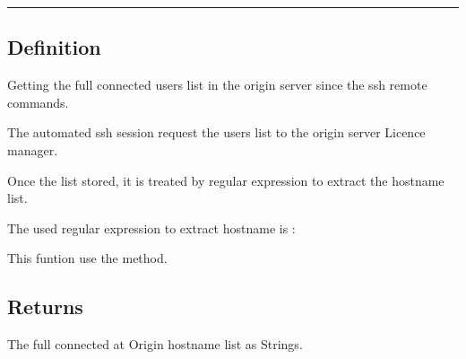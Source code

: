 \documentclass[letterpaper,10pt,english]{sphinxmanual}
\begin{document}
\bigskip\hrule\bigskip



\subsection{Definition}
\label{\detokenize{OA/Get_Connected:definition}}
\sphinxAtStartPar
Getting the full connected users list in the origin server since the ssh remote commands.

\sphinxAtStartPar
The automated ssh session request the users list to the origin server Licence manager.

\sphinxAtStartPar
Once the list stored, it is treated by regular expression to extract the hostname list.

\sphinxAtStartPar
The used regular expression to extract hostname is : 

\sphinxAtStartPar
This funtion use the  method.


\subsection{Returns}
\label{\detokenize{OA/Get_Connected:returns}}
\sphinxAtStartPar
{}

\sphinxAtStartPar
The full connected at Origin hostname list as Strings.
\end{document}
